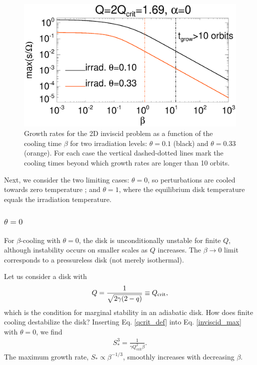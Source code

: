 \begin{figure}
  \includegraphics[width=\linewidth,clip=true,trim=0cm 0cm 0cm
    0.0cm]{figures/2dinvisc_theta}
  \caption{
    Growth rates for the 2D inviscid problem as a function of
    the cooling time $\beta$ for two irradiation levels: $\theta=0.1$ (black) and
    $\theta=0.33$ (orange). For each case the vertical dashed-dotted
    lines mark the cooling times beyond which 
    growth rates are longer than 10 orbits. 
    \label{invisc_theta}}
\end{figure}



Next, we consider the two limiting cases: $\theta=0$, so perturbations are
cooled towards zero temperature \citep[typically employed in
numerical simulations, e.g.][]{gammie01}; and $\theta=1$, where the
equilibrium disk temperature equals the irradiation temperature.  






\subsubsection{$\theta = 0$}\label{theta0}
For $\beta$-cooling with $\theta=0$, the disk is unconditionally
unstable for finite $Q$, although instability occurs on smaller scales
as $Q$ increases.  The $\beta\to0$ limit corresponds to a 
pressureless disk (not merely isothermal).   

Let us consider a disk with 
\begin{align}\label{qcrit_def}
  Q = \frac{1}{\sqrt{2\gamma(2-q)}}\equiv Q_{\mathrm{crit}},
\end{align} 
which is the condition for marginal stability in an adiabatic disk. 
How does finite cooling destabilize the disk?  
Inserting Eq. \ref{qcrit_def} into Eq. \ref{inviscid_max} with 
$\theta=0$, we find 
\begin{align}\label{sstar}
  S_*^3 = \frac{1}{\gamma Q_\mathrm{crit}^2 \beta}. 
\end{align}
The maximum growth rate, $S_*\propto \beta^{-1/3}$, smoothly
increases with decreasing $\beta$. 

